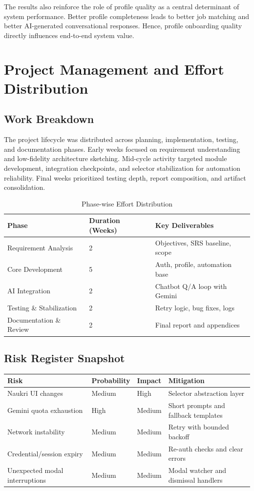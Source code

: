 \documentclass[12pt,a4paper,oneside]{report}
\begin{document}
The results also reinforce the role of profile quality as a central determinant of system performance. Better profile completeness leads to better job matching and better AI-generated conversational responses. Hence, profile onboarding quality directly influences end-to-end system value.

\chapter{Project Management and Effort Distribution}
\section{Work Breakdown}
The project lifecycle was distributed across planning, implementation, testing, and documentation phases. Early weeks focused on requirement understanding and low-fidelity architecture sketching. Mid-cycle activity targeted module development, integration checkpoints, and selector stabilization for automation reliability. Final weeks prioritized testing depth, report composition, and artifact consolidation.

\begin{table}[H]
\centering
\caption{Phase-wise Effort Distribution}
\begin{tabular}{p{}p{}p{}}
\toprule
Phase & Duration (Weeks) & Key Deliverables \\
\midrule
Requirement Analysis & 2 & Objectives, SRS baseline, scope \\
Core Development & 5 & Auth, profile, automation base \\
AI Integration & 2 & Chatbot Q/A loop with Gemini \\
Testing \& Stabilization & 2 & Retry logic, bug fixes, logs \\
Documentation \& Review & 2 & Final report and appendices \\
\bottomrule
\end{tabular}
\end{table}

\section{Risk Register Snapshot}
\begin{longtable}{p{}p{}p{}p{}}
\toprule
Risk & Probability & Impact & Mitigation \\
\midrule
Naukri UI changes & Medium & High & Selector abstraction layer \\
Gemini quota exhaustion & High & Medium & Short prompts and fallback templates \\
Network instability & Medium & Medium & Retry with bounded backoff \\
Credential/session expiry & Medium & Medium & Re-auth checks and clear errors \\
Unexpected modal interruptions & Medium & Medium & Modal watcher and dismissal handlers \\
\bottomrule
\end{longtable}
\end{document}
